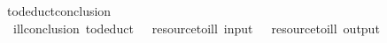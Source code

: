 \ to{\isacharunderscore}deduct{\isacharunderscore}conclusion{\isacharcolon}\isanewline
\ \ ill{\isacharunderscore}conclusion\ {\isacharparenleft}to{\isacharunderscore}deduct\ \ {\isacharequal}\ {\isacharbrackleft}resource{\isacharunderscore}to{\isacharunderscore}ill\ {\isacharparenleft}input\ \ \isasymturnstile\ resource{\isacharunderscore}to{\isacharunderscore}ill\ {\isacharparenleft}output\ 
